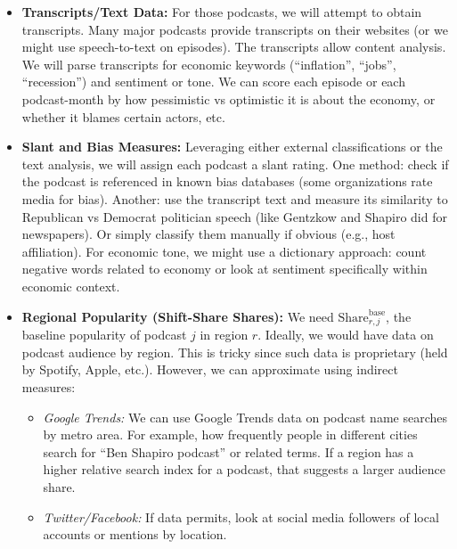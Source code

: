 \documentclass[12pt]{article}
\begin{document}
\begin{itemize}
          Using this, we will identify a subset of podcasts that regularly cover macroeconomic or political-economic topics. For example, podcasts like \textit{Planet Money}, \textit{Marketplace}, \textit{Macro Musings}, or more partisan ones like \textit{Pod Save America} (liberal) or \textit{The Ben Shapiro Show} (conservative, which often discusses economy among politics). We will curate a list of perhaps the top 100-200 such podcasts by audience size.
    \item \textbf{Transcripts/Text Data:} For those podcasts, we will attempt to obtain transcripts. Many major podcasts provide transcripts on their websites (or we might use speech-to-text on episodes). The transcripts allow content analysis. We will parse transcripts for economic keywords (``inflation'', ``jobs'', ``recession'') and sentiment or tone. We can score each episode or each podcast-month by how pessimistic vs optimistic it is about the economy, or whether it blames certain actors, etc.
    \item \textbf{Slant and Bias Measures:} Leveraging either external classifications or the text analysis, we will assign each podcast a slant rating. One method: check if the podcast is referenced in known bias databases (some organizations rate media for bias). Another: use the transcript text and measure its similarity to Republican vs Democrat politician speech (like Gentzkow and Shapiro did for newspapers). Or simply classify them manually if obvious (e.g., host affiliation).
          For economic tone, we might use a dictionary approach: count negative words related to economy or look at sentiment specifically within economic context.
    \item \textbf{Regional Popularity (Shift-Share Shares):} We need $\text{Share}_{r,j}^{\text{base}}$, the baseline popularity of podcast $j$ in region $r$. Ideally, we would have data on podcast audience by region. This is tricky since such data is proprietary (held by Spotify, Apple, etc.). However, we can approximate using indirect measures:
          \begin{itemize}
              \item \textit{Google Trends:} We can use Google Trends data on podcast name searches by metro area. For example, how frequently people in different cities search for ``Ben Shapiro podcast'' or related terms. If a region has a higher relative search index for a podcast, that suggests a larger audience share.
              \item \textit{Twitter/Facebook:} If data permits, look at social media followers of local accounts or mentions by location.

\end{itemize}
\end{itemize}
\end{document}
